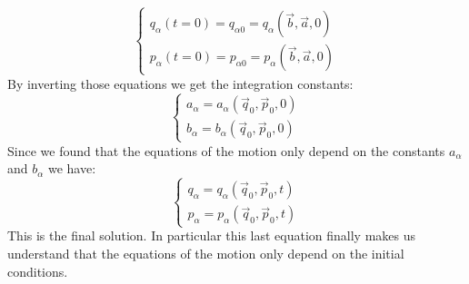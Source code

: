 \begin{equation}
  \begin{cases}
    q_{\alpha}(t=0)= q_{\alpha 0} = q_{\alpha}(\vec{b},\vec{a},0)\\[8pt]
    p_{\alpha}(t=0)= p_{\alpha 0} = p_{\alpha}(\vec{b},\vec{a},0)
  \end{cases}
\end{equation}
By inverting those equations we get the integration constants:
\begin{equation}
  \begin{cases}
    a_{\alpha} = a_{\alpha}(\vec{q}_0,\vec{p}_0,0)\\[8pt]
    b_{\alpha} = b_{\alpha}(\vec{q}_0,\vec{p}_0,0)
  \end{cases}
\end{equation}
Since we found that the equations of the motion only depend on the constants $a_{\alpha}$ and $b_{\alpha}$ we have:
\begin{equation}
  \begin{cases}
    q_{\alpha} = q_{\alpha}(\vec{q}_0,\vec{p}_0,t)\\[8pt]
    p_{\alpha} = p_{\alpha}(\vec{q}_0,\vec{p}_0,t)
  \end{cases}
\end{equation}
This is the final solution. In particular this last equation finally makes us understand that the equations of the motion only depend on the initial conditions.
